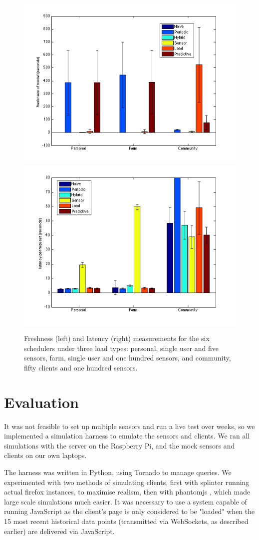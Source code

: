 \documentclass[a4paper]{acm_proc_article-sp}
\begin{document}
\begin{figure}
  \centering
      \includegraphics[width=0.48\linewidth]{freshness.png}
      \includegraphics[width=0.48\linewidth]{latency_for_schedulers.png}
  \caption{\label{fig:main-results}Freshness (left) and latency (right) measurements for the six schedulers under three load types: personal, single user and five sensors, farm, single user and one hundred sensors, and community, fifty clients and one hundred sensors.}
\end{figure}

\section{Evaluation}

It was not feasible to set up multiple sensors and run a live test over weeks, so we implemented a simulation harness to emulate the sensors and clients.  We ran all simulations with the server on the Raspberry Pi, and the mock sensors and clients on our own laptops. 

The harness was written in Python, using Tornado to manage queries.  We experimented with two methods of simulating clients, first with splinter \cite{Splinter} running actual firefox instances, to maximise realism, then with phantomjs \cite{phantomjs}, which made large scale simulations much easier.  It was necessary to use a system capable of running JavaScript as the client's page is only considered to be "loaded" when the 15 most recent historical data points (transmitted via WebSockets, as described earlier) are delivered via JavaScript.
\end{document}
